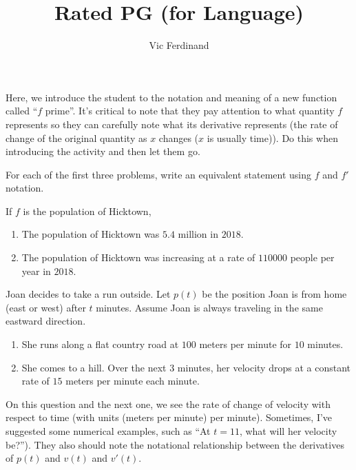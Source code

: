 \documentclass{ximera}
\author{Vic Ferdinand}
\title{Rated PG (for Language)}
\begin{document}
\begin{abstract}
\end{abstract}
\maketitle


\begin{instructorIntro}
Here, we introduce the student to the notation and meaning of a new function called ``$f$ prime''.  It's critical to note that they pay attention to what quantity $f$ represents so they can carefully note what its derivative represents (the rate of change of the original quantity as $x$ changes ($x$ is usually time)).  Do this when introducing the activity and then let them go.  
\end{instructorIntro}

For each of the first three problems, write an equivalent statement using $f$  and $f'$ notation.

\begin{question} 
If $f$ is the population of Hicktown,
\begin{enumerate}
\item The population of Hicktown was $5.4$ million in $2018$.
\item The population of Hicktown was increasing at a rate of $110000$ people per year in $2018$.
\end{enumerate}
\end{question}
\begin{question} 
Joan decides to take a run outside.  Let $p(t)$ be the position Joan is from home (east or west) after $t$ minutes.  Assume Joan is always traveling in the same eastward direction.
\begin{enumerate}
\item 	She runs along a flat country road at $100$ meters per minute for $10$ minutes.
\item	She comes to a hill.  Over the next $3$ minutes, her velocity drops at a constant rate of $15$ meters per minute each minute.
\end{enumerate}


\begin{instructorNotes}
On this question and the next one, we see the rate of change of velocity with respect to time (with units (meters per minute) per minute).  Sometimes, I've suggested some numerical examples, such as ``At $t=11$, what will her velocity be?'').  They also should note the notational relationship between the derivatives of $p(t)$ and $v(t)$ and $v'(t)$.
\end{instructorNotes}

\end{question}
\end{document}

